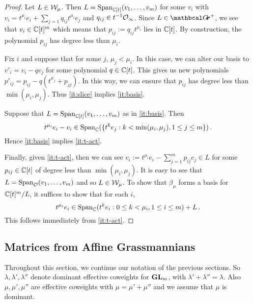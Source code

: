 \documentclass[draft]{article} %
\begin{document}
\begin{proof}
    Let $ L \in \mathcal W_\mu$.  Then $ L = \operatorname{Span}_{\mathbb C[t]}(v_1, \dots, v_m) $ for some $ v_i $ with $ v_i = t^{\mu_i} e_i + \sum_{j=1} q_{ij}t^{\mu_i} e_j $ and $ q_{ij} \in t^{-1} \mathcal O_\infty$.  Since $ L \in \Grth^+ $, we see that $ v_i \in \mathbb C[t]^m$ which means that $ p_{ij} := q_{ij}t^{\mu_i} $ lies in $ \mathbb C[t]$.  By construction, the polynomial $ p_{ij}$ has degree less than $ \mu_i$.
    
    Fix $ i$ and suppose that for some $ j$, $ \mu_j < \mu_i$.  In this case, we can alter our basis to $ v'_i = v_i - q v_j$ for some polynomial $q \in \mathbb C[t]$.  
    This gives us new polynomials $ p'_{ij} = p_{ij} - q (t^{\mu_j} + p_{jj}) $.  In this way, we can ensure that $ p_{ij} $ has degree less than $ \min(\mu_i, \mu_j)$.  
    Thus \cref{it:slice} implies \cref{it:basis}.
    
    Suppose that $ L = \operatorname{Span}_{\mathbb C[t]}(v_1, \dots, v_m)$ as in \cref{it:basis}.  Then
    $$t^{\mu_i} e_i - v_i \in \operatorname{Span}_\mathbb C(\{t^k e_j :  k < \min(\mu_i, \mu_j), 1 \le j \le m \})  \,. $$
    Hence \cref{it:basis} implies \cref{it:t-act}.  

    Finally, given \cref{it:t-act}, then we can see $ v_i := t^{\mu_i} e_i - \sum_{j=1}^m p_{ij} e_j \in L $ for some $ p_{ij} \in \mathbb C[t]$ of degree less than $ \min(\mu_i,\mu_j) $.  It is easy to see that $ L = \operatorname{Span}_\mathcal O(v_1, \dots, v_m) $ and so $ L \in \mathcal W_\mu$.  
    To show that $ \beta_\mu$ forms a basis for $ \mathbb C[t]^m/L$, it suffices to show that for each $ i$, 
    $$ t^{\mu_i} e_i  \in \operatorname{Span}_\mathbb C(  t^k e_i : 0 \le k < \mu_i, 1 \le i \le m) + L\,.$$
    This follows immediately from \cref{it:t-act}.
\end{proof}
% 

% 
\subsection{Matrices from Affine Grassmannians}
\label{ss:mvyisos}
% 
Throughout this section, we continue our notation of the previous sections. So $ \lambda, \lambda', \lambda''$ denote dominant effective coweights for $ {\mathbf{GL}}_m$, with $ \lambda' + \lambda'' = \lambda$.  Also $ \mu, \mu', \mu''$ are effective coweights with $ \mu = \mu' + \mu''$ and we assume that $ \mu$ is dominant.
\end{document}
